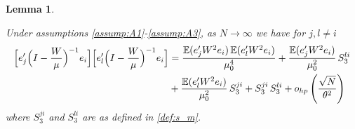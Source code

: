 \documentclass[11pt, reqno]{amsart}
\numberwithin{equation}{section}
\newtheorem{lemma}{Lemma}[section]
\begin{document}
\begin{lemma}\label{EigenVector.2}

Under assumptions \ref{assump:A1}-\ref{assump:A3}, as $N \to \infty$ we have for $j,l \neq i$
\begin{align*}
\Bigl[e_j^\prime\Bigl(I - \frac{W}{\mu}\Bigr)^{-1}e_i\Bigr]\Bigl[e_l^\prime\Bigl(I - \frac{W}{\mu}\Bigr)^{-1}e_i\Bigr]
&= \frac{\mathbb E(e_j^\prime W^2 e_i)\,\mathbb E(e_l^\prime W^2 e_i)}{\mu_0^4} + \frac{\mathbb E(e_j^\prime W^2 e_i)}{\mu_0^2}\,S_3^{li}
\\
&+ \frac{\mathbb E(e_l^\prime W^2 e_i)}{\mu_0^2}\,S_3^{ji} + S_3^{ji}\,S_3^{li} 
+ o_{hp}\left( \frac{\sqrt{N}}{\theta^2}\right)
\end{align*}
where $S_3^{ji}$ and $S_3^{li}$ are as defined in \eqref{def:s_m}.
\end{lemma}
\end{document}
